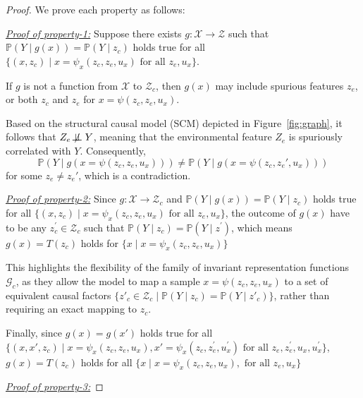 \begin{proof}
We prove each property as follows:


\underline{\textit{Proof of property-1:}} Suppose there exists $g: \mathcal{X}\rightarrow \mathcal{Z}$ such that $\mathbb{P}(Y\mid g(x)) = \mathbb{P}(Y\mid z_c)$ holds true for all $\{(x,z_c)\mid  x= \psi_x(z_c, z_e, u_x) \text{ for all }z_e,u_x\}$.

If \( g \) is not a function from \( \mathcal{X} \) to \( \mathcal{Z}_c \), then \( g(x) \) may include spurious features \( z_e \), or both \( z_c \) and \( z_e \) for $x=\psi(z_c,z_e,u_x)$.

Based on the structural causal model (SCM) depicted in Figure~\ref{fig:graph}, it follows that \( Z_e \not\!\perp\!\!\!\perp Y \), meaning that the environmental feature \( Z_e \) is spuriously correlated with \( Y \). Consequently, 
\[
\mathbb{P}(Y \mid g(x = \psi(z_c, z_e, u_x))) \neq \mathbb{P}(Y \mid g(x = \psi(z_c, z_e', u_x)))
\]
for some \( z_e \neq z_e' \), which is a contradiction.

\underline{\textit{Proof of property-2:}} Since $g: \mathcal{X}\rightarrow \mathcal{Z}_c$ and $\mathbb{P}(Y\mid g(x)) = \mathbb{P}(Y\mid z_c)$ holds true for all $\{(x,z_c)\mid  x= \psi_x(z_c, z_e, u_x) \text{ for all }z_e,u_x\}$, the outcome of $g(x)$ have to be any $z^{'}_c\in \mathcal{Z}_c$ such that $\mathbb{P}(Y\mid z_c)=\mathbb{P}(Y\mid z^{'})$, which means \(g(x) = T(z_c)\) holds for  \(\{x \mid x = \psi_x(z_c, z_e, u_x)\}\)

This highlights the flexibility of the family of invariant representation functions \(\mathcal{G}_c\), as they allow the model to map a sample \(x = \psi(z_c, z_e, u_x)\) to a set of equivalent causal factors \(\{z'_c \in \mathcal{Z}_c \mid \mathbb{P}(Y \mid z_c) = \mathbb{P}(Y \mid z'_c)\}\), rather than requiring an exact mapping to \(z_c\).

Finally, since $g(x)=g(x')$ holds true for all $\{(x,x',z_c)\mid  x= \psi_x(z_c, z_e, u_x), x'= \psi_x(z_c, z^{'}_e, u^{'}_x) \text{ for all }z_e,z^{'}_e, u_x, u^{'}_x\}$, \(g(x) = T(z_c)\) holds for all \(\{x \mid x = \psi_x(z_c, z_e, u_x), \text{ for all } z_e, u_x\}\)

\underline{\textit{Proof of property-3:}}


\end{proof}
